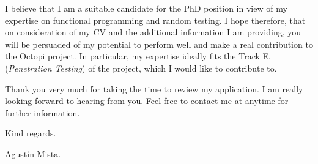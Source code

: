 \documentclass[helvetica,notitle,flagCMYK,totpages,11pt]{europecv}
\begin{document}
I believe that I am a suitable candidate for the PhD position in view of my
expertise on functional programming and random testing.
%
I hope therefore, that on consideration of my CV and the additional information
I am providing, you will be persuaded of my potential to perform well and make a
real contribution to the Octopi project.
%
In particular, my expertise ideally fits the Track E. (\emph{{Penetration
    Testing}}) of the project, which I would like to contribute to.


Thank you very much for taking the time to review my application. I am really
looking forward to hearing from you. Feel free to contact me at anytime for
further information.

Kind regards.



\vfill
Agustín Mista.
\end{document}
